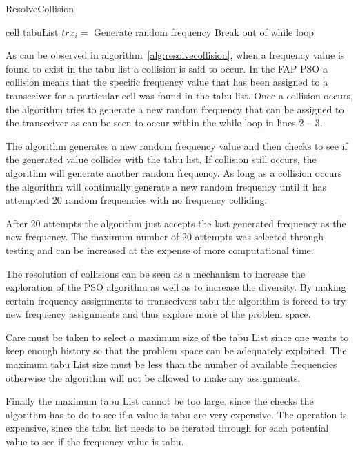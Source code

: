 \begin{algorithm}[H]
\caption{ResolveCollision}
\label{alg:resolvecollision}
\begin{algorithmic}[1]
	\Require cell
	\Require tabuList
				\State $trx_i = $ Generate random frequency
					\State Break out of while loop
				\EndIf
			\EndWhile
	\EndFor
\end{algorithmic}
\end{algorithm}

As can be observed in algorithm~\ref{alg:resolvecollision}, when a frequency value is found to exist in the tabu list a collision is said to occur. In the FAP PSO a collision means that the specific frequency value that has been assigned to a transceiver for a particular cell was found in the tabu list. Once a collision occurs, the algorithm tries to generate a new random frequency that can be assigned to the transceiver as can be seen to occur within the while-loop in lines 2 -- 3.

The algorithm generates a new random frequency value and then checks to see if the generated value collides with the tabu list. If collision still occurs, the algorithm will generate another random frequency. As long as a collision occurs the algorithm will continually generate a new random frequency until it has attempted 20 random frequencies with no frequency colliding. 

After 20 attempts the algorithm just accepts the last generated frequency as the new frequency. The maximum number of 20  attempts was selected through testing and can be increased at the expense of more computational time. 

The resolution of collisions can be seen as a mechanism to increase the exploration of the PSO algorithm as well as to increase the diversity. By making certain frequency assignments to transceivers tabu the algorithm is forced to try new frequency assignments and thus explore more of the problem space.

Care must be taken to select a maximum size of the tabu List since one wants to keep enough history so that the problem space can be adequately exploited. The maximum tabu List size must be less than the number of available frequencies otherwise the algorithm will not be allowed to make any assignments. 

Finally the maximum tabu List cannot be too large, since the checks the algorithm has to do to see if a value is tabu are very expensive. The operation is expensive, since the tabu list needs to be iterated through for each potential value to see if the frequency value is tabu.

